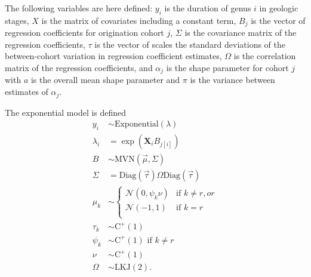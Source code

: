 \documentclass{article}
\begin{document}
The following variables are here defined: \(y_{i}\) is the duration of genus \(i\) in geologic stages, \(X\) is the matrix of covariates including a constant term, \(B_{j}\) is the vector of regression coefficients for origination cohort \(j\), \(\Sigma\) is the covariance matrix of the regression coefficients, \(\tau\) is the vector of scales the standard deviations of the between-cohort variation in regression coefficient estimates, \(\Omega\) is the correlation matrix of the regression coefficients, and \(\alpha_{j}\) is the shape parameter for cohort \(j\) with \(a\) is the overall mean shape parameter and \(\pi\) is the variance between estimates of \(\alpha_{j}\).

The exponential model is defined
\begin{equation}
  \begin{aligned}
    y_{i} &\sim \mathrm{Exponential}(\lambda) \\
    \lambda_{i} &= \exp(\mathbf{X}_{i} B_{j[i]}) \\
    B &\sim \mathrm{MVN}(\vec{\mu}, \Sigma) \\
    \Sigma &= \text{Diag}(\vec{\tau}) \Omega \text{Diag}(\vec{\tau}) \\
    \mu_{k} &\sim 
    \begin{cases} 
      \mathcal{N}(0, \psi_{k} \nu) & \text{if } k \neq r, or \\
      \mathcal{N}(-1, 1) & \text{if } k = r \\
    \end{cases} \\
    \tau_{k} &\sim \mathrm{C^{+}}(1) \\
    \psi_{k} &\sim \mathrm{C^{+}}(1) \text{ if } k \neq r \\
    \nu &\sim \mathrm{C^{+}}(1) \\
    \Omega &\sim \text{LKJ}(2).
  \end{aligned}
  \label{eq:exp_total}
\end{equation}
\end{document}

